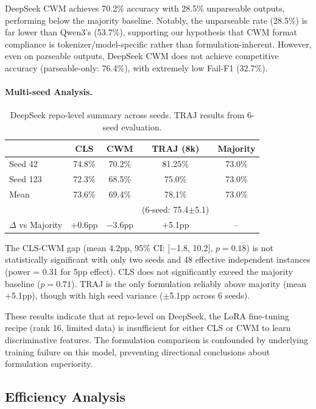 \documentclass[11pt]{article}
\begin{document}
DeepSeek CWM achieves 70.2\% accuracy with 28.5\% unparseable outputs, performing below the majority baseline. Notably, the unparseable rate (28.5\%) is far lower than Qwen3's (53.7\%), supporting our hypothesis that CWM format compliance is tokenizer/model-specific rather than formulation-inherent. However, even on parseable outputs, DeepSeek CWM does not achieve competitive accuracy (parseable-only: 76.4\%), with extremely low Fail-F1 (32.7\%).

\paragraph{Multi-seed Analysis.}

\begin{table}[h]
\centering
\caption{DeepSeek repo-level summary across seeds. TRAJ results from 6-seed evaluation.}
\label{tab:deepseek-summary}
\begin{tabular}{lcccc}
\toprule
 & CLS & CWM & TRAJ (8k) & Majority \\
\midrule
Seed 42 & 74.8\% & 70.2\% & 81.25\% & 73.0\% \\
Seed 123 & 72.3\% & 68.5\% & 75.0\% & 73.0\% \\
Mean & 73.6\% & 69.4\% & 78.1\% & 73.0\% \\
& & & (6-seed: 75.4$\pm$5.1) & \\
$\Delta$ vs Majority & +0.6pp & $-$3.6pp & +5.1pp & -- \\
\bottomrule
\end{tabular}
\end{table}

The CLS-CWM gap (mean 4.2pp, 95\% CI: [$-$1.8, 10.2], $p = 0.18$) is not statistically significant with only two seeds and 48 effective independent instances (power = 0.31 for 5pp effect). CLS does not significantly exceed the majority baseline ($p = 0.71$). TRAJ is the only formulation reliably above majority (mean +5.1pp), though with high seed variance ($\pm$5.1pp across 6 seeds).

These results indicate that at repo-level on DeepSeek, the LoRA fine-tuning recipe (rank 16, limited data) is insufficient for either CLS or CWM to learn discriminative features. The formulation comparison is confounded by underlying training failure on this model, preventing directional conclusions about formulation superiority.

\subsection{Efficiency Analysis}
\end{document}
